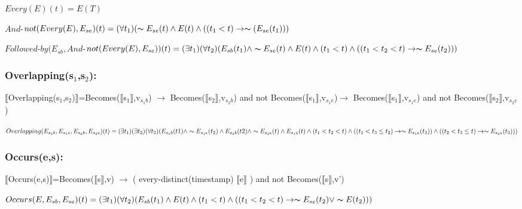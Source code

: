 \(Every(E)(t)=E(T)\)

$And$-\(not(Every(E),E_{se})(t)=(\forall t_1)(\thicksim E_{se}(t)\wedge E(t)\wedge ((t_1<t)\rightarrow \thicksim (E_{se}(t_1)))\)

$Followed$-\(by(E_{sb},And\)-\(not(Every(E),E_{se}))(t)=(\exists t_1)(\forall t_2)(E_{sb}(t_1)\wedge \thicksim E_{se}(t)\wedge E(t)\wedge (t_1<t)\wedge ((t_1<t_2<t)\rightarrow \thicksim E_{se}(t_2)))\)\\

\subsubsection*{Overlapping(s$_1$,s$_2$):}
\begin{eplpseudocode}
$\llbracket$Overlapping(s$_1$,s$_2$)$\rrbracket$=Becomes($\llbracket$s$_1$$\rrbracket$,v$_{s_{1}b}$) $\rightarrow$ Becomes($\llbracket$s$_2$$\rrbracket$,v$_{s_{2}b}$) and not Becomes($\llbracket$s$_1$$\rrbracket$,v$_{s_{1}e}$)$ \rightarrow$ 
                                                Becomes($\llbracket$s$_1$$\rrbracket$,v$_{s_{1}e}$) and not Becomes($\llbracket$s$_2$$\rrbracket$,v$_{s_{2}e}$) 
\end{eplpseudocode}
\(Overlapping(E_{s_{1}b},E_{s_{1}e},E_{s_{2}b},E_{s_{2}e})(t)=(\exists t_1)(\exists t_2)(\forall t_3)(E_{s_{1}b}(t1)\wedge \thicksim E_{s_{1}e}(t_2)\wedge E_{s_{2}b}(t2)\wedge \thicksim E_{s_{2}e}(t) \wedge E_{s_{1}e}(t)\wedge (t_1<t_2<t)\wedge ((t_1<t_3\leq t_2)\rightarrow \thicksim E_{s_{1}e}(t_3)) \wedge ((t_2<t_3\leq t)\rightarrow \thicksim E_{s_{2}e}(t_3))) \)\\

\subsubsection*{Occurs(e,s):}
\begin{eplpseudocode}
$\llbracket$Occurs(e,s)$\rrbracket$=Becomes($\llbracket$s$\rrbracket$,v) $\rightarrow$ ( every-distinct(timestamp) $\llbracket$e$\rrbracket$ ) and not Becomes($\llbracket$s$\rrbracket$,v')
\end{eplpseudocode}
\(Occurs(E,E_{sb},E_{se})(t)=(\exists t_1)(\forall t_2)(E_{sb}(t_1)\wedge E(t)\wedge (t_1<t)\wedge ((t_1<t_2<t)\rightarrow \thicksim E_{se}(t_2) \vee \thicksim E(t_2)))\)\\

